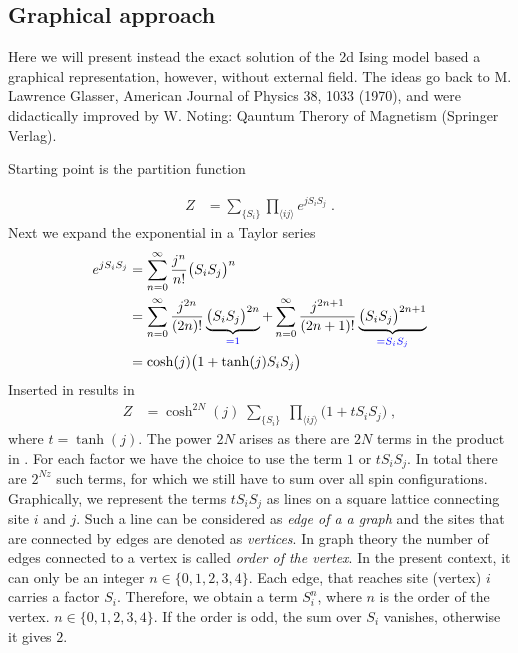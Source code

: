 \subsection{Graphical approach }
Here we will present instead the exact solution of the 2d Ising model based a graphical representation, however, without external field.
The  ideas go back to M. Lawrence Glasser, American Journal of Physics 38, 1033 (1970), and were
didactically improved by W. Noting: Qauntum Therory of Magnetism (Springer Verlag).

Starting point is the partition function
%

\begin{align}\label{eq:Ising:2d:Z}
Z &= \sum_{\{S_{i}\}} \prod_{\langle ij \rangle} e^{j S_{i}S_{j}}\;.
\end{align}
%
Next we expand the exponential in a Taylor series
%
\begin{align*}
 e^{j S_{i}S_{j}} 
&= \sum_{n=0}^{\infty}\frac{j^{n}}{n!} \big( S_{i}S_{j} \big)^{n}\\
&= \sum_{n=0}^{\infty}\frac{j^{2n}}{(2n)!} \underbrace{
\big( S_{i}S_{j} \big)^{2n}
}_{\color{blue} = 1}
+\sum_{n=0}^{\infty}\frac{j^{2n+1}}{(2n+1)!} \underbrace{
\big( S_{i}S_{j} \big)^{2n+1}
}_{\color{blue} = S_{i}S_{j}}\\
&= \cosh(j)\big(1 + \tanh(j) S_{i}S_{j}\big)
\end{align*}
%
Inserted in  results in
%
\begin{align*}
Z&= \cosh^{2N}(j) \;\sum_{\{S_{i}\}}\;\prod_{\langle ij \rangle} \big( 1+ t S_{i} S_{j}\big)\;,
\end{align*}
%
where  $t=\tanh(j)$. The power $2N$ arises as there are $2N$ terms in the product in . For each factor we have the choice to use
the term $1$ or $t S_{i}S_{j}$. In total there are $2^{Nz}$ such terms, for which we still have to sum over all spin configurations. Graphically, we represent the terms $t S_{i}S_{j}$ as lines 
on a square lattice connecting site $i$ and $j$. Such a line can be considered as {\em edge of a a graph} and the sites that are connected by edges are 
denoted as  {\em vertices}. In graph theory the number of edges connected to a vertex is called {\em order of the vertex}. In the present context, it can only be
an integer $n\in\{0,1,2,3,4\}$.
Each edge, that reaches site (vertex)  $i$  carries a factor $S_{i}$. Therefore, we obtain a term $S_{i}^{n}$, where $n$ is the order of the vertex. $n\in\{0,1,2,3,4\}$. If the order is odd, the sum over $S_{i}$ vanishes, otherwise it gives $2$. 
